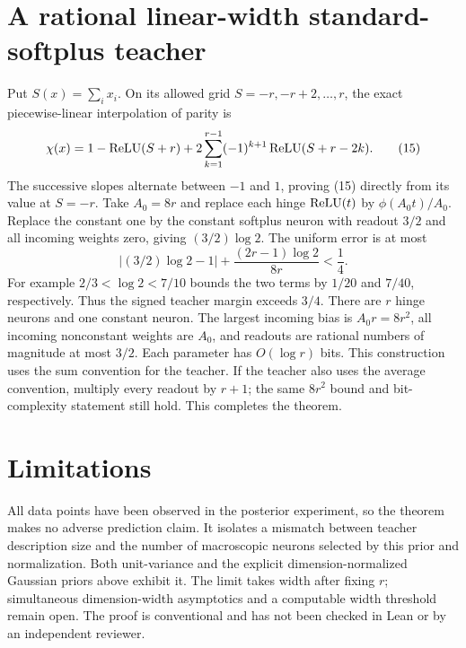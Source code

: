 \documentclass[11pt]{article}
\begin{document}
\section{A rational linear-width standard-softplus teacher}
Put $S(x)=\sum_i x_i$. On its allowed grid
$S=-r,-r+2,\ldots,r$, the exact piecewise-linear interpolation of
parity is
\[
 \chi(x)=1-\operatorname{ReLU}(S+r)
       +2\sum_{k=1}^{r-1}(-1)^{k+1}\operatorname{ReLU}(S+r-2k).            \tag{15}
\]
The successive slopes alternate between $-1$ and $1$, proving (15)
directly from its value at $S=-r$.
Take $A_0=8r$ and replace each hinge $\operatorname{ReLU}(t)$ by
$\phi(A_0t)/A_0$. Replace the constant one by the constant softplus
neuron with readout $3/2$ and all incoming weights zero, giving
$(3/2)\log2$. The uniform error is at most
\[
 |(3/2)\log2-1|+\frac{(2r-1)\log2}{8r}<\frac14.
\]
For example $2/3<\log2<7/10$ bounds the two terms by $1/20$ and
$7/40$, respectively. Thus the signed teacher margin exceeds $3/4$.
There are $r$ hinge neurons and one constant neuron. The largest
incoming bias is $A_0r=8r^2$, all incoming nonconstant weights are
$A_0$, and readouts are rational numbers of magnitude at most $3/2$.
Each parameter has $O(\log r)$ bits. This construction uses the sum
convention for the teacher. If the teacher also uses the average
convention, multiply every readout by $r+1$; the same $8r^2$ bound and
bit-complexity statement still hold. This completes the theorem.

\section{Limitations}
All data points have been observed in the posterior experiment, so
the theorem makes no adverse prediction claim. It isolates a mismatch
between teacher description size and the number of macroscopic neurons
selected by this prior and normalization. Both unit-variance and the
explicit dimension-normalized Gaussian priors above exhibit it. The limit takes width
after fixing $r$; simultaneous dimension-width asymptotics and a
computable width threshold remain open. The proof is conventional and
has not been checked in Lean or by an independent reviewer.
\end{document}
